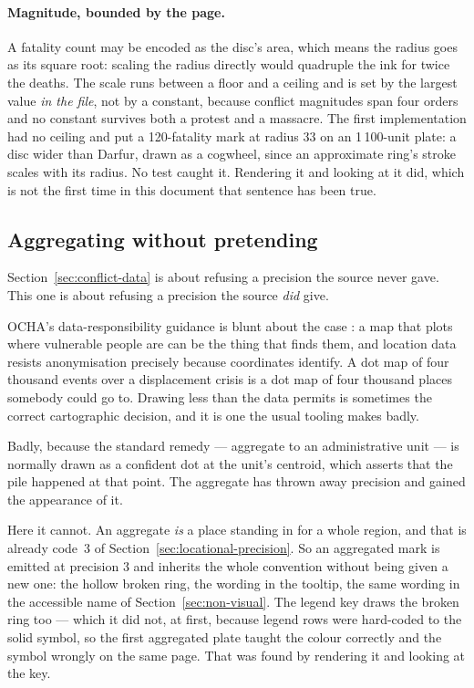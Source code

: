 \documentclass[11pt]{article}
\begin{document}
\paragraph{Magnitude, bounded by the page.} A fatality count may be
encoded as the disc's area, which means the radius goes as its square root:
scaling the radius directly would quadruple the ink for twice the deaths.
The scale runs between a floor and a ceiling and is set by the largest
value \emph{in the file}, not by a constant, because conflict magnitudes
span four orders and no constant survives both a protest and a massacre.
The first implementation had no ceiling and put a 120-fatality mark at
radius 33 on an 1\,100-unit plate: a disc wider than Darfur, drawn as a
cogwheel, since an approximate ring's stroke scales with its radius. No
test caught it. Rendering it and looking at it did, which is not the first
time in this document that sentence has been true.

\subsection{Aggregating without pretending}
\label{sec:aggregating}
\label{sec:aggregate}

Section~\ref{sec:conflict-data} is about refusing a precision the source never
gave. This one is about refusing a precision the source \emph{did} give.

OCHA's data-responsibility guidance is blunt about the case
\parencite{ocha-data-responsibility}: a map that plots where vulnerable people
are can be the thing that finds them, and location data resists anonymisation
precisely because coordinates identify. A dot map of four thousand events over
a displacement crisis is a dot map of four thousand places somebody could go
to. Drawing less than the data permits is sometimes the correct cartographic
decision, and it is one the usual tooling makes badly.

Badly, because the standard remedy --- aggregate to an administrative unit ---
is normally drawn as a confident dot at the unit's centroid, which asserts
that the pile happened at that point. The aggregate has thrown away precision
and gained the appearance of it.

Here it cannot. An aggregate \emph{is} a place standing in for a whole region,
and that is already code~3 of Section~\ref{sec:locational-precision}. So an
aggregated mark is emitted at precision 3 and inherits the whole convention
without being given a new one: the hollow broken ring, the wording in the
tooltip, the same wording in the accessible name of
Section~\ref{sec:non-visual}. The legend key draws the broken ring too ---
which it did not, at first, because legend rows were hard-coded to the solid
symbol, so the first aggregated plate taught the colour correctly and the
symbol wrongly on the same page. That was found by rendering it and looking at
the key.
\end{document}
